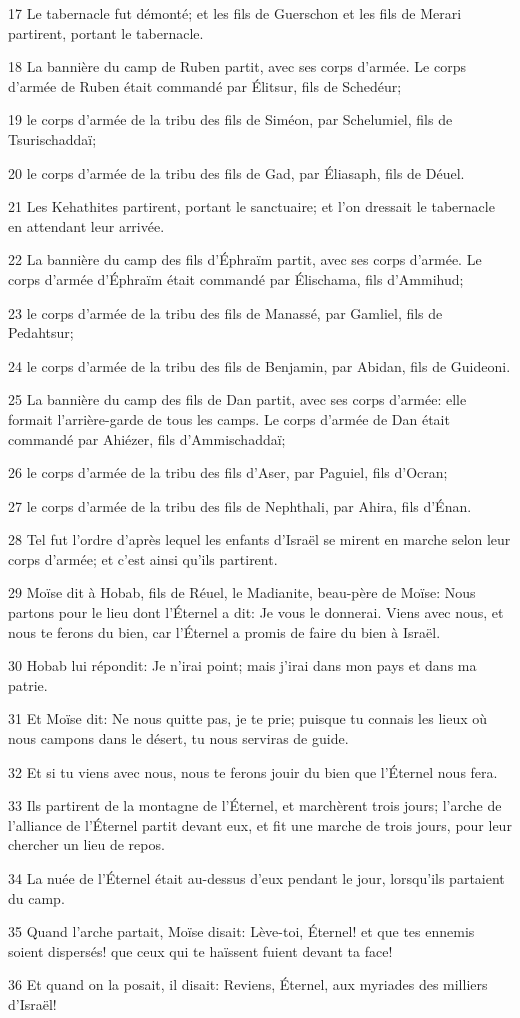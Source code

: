 \par 17 Le tabernacle fut démonté; et les fils de Guerschon et les fils de Merari partirent, portant le tabernacle.
\par 18 La bannière du camp de Ruben partit, avec ses corps d'armée. Le corps d'armée de Ruben était commandé par Élitsur, fils de Schedéur;
\par 19 le corps d'armée de la tribu des fils de Siméon, par Schelumiel, fils de Tsurischaddaï;
\par 20 le corps d'armée de la tribu des fils de Gad, par Éliasaph, fils de Déuel.
\par 21 Les Kehathites partirent, portant le sanctuaire; et l'on dressait le tabernacle en attendant leur arrivée.
\par 22 La bannière du camp des fils d'Éphraïm partit, avec ses corps d'armée. Le corps d'armée d'Éphraïm était commandé par Élischama, fils d'Ammihud;
\par 23 le corps d'armée de la tribu des fils de Manassé, par Gamliel, fils de Pedahtsur;
\par 24 le corps d'armée de la tribu des fils de Benjamin, par Abidan, fils de Guideoni.
\par 25 La bannière du camp des fils de Dan partit, avec ses corps d'armée: elle formait l'arrière-garde de tous les camps. Le corps d'armée de Dan était commandé par Ahiézer, fils d'Ammischaddaï;
\par 26 le corps d'armée de la tribu des fils d'Aser, par Paguiel, fils d'Ocran;
\par 27 le corps d'armée de la tribu des fils de Nephthali, par Ahira, fils d'Énan.
\par 28 Tel fut l'ordre d'après lequel les enfants d'Israël se mirent en marche selon leur corps d'armée; et c'est ainsi qu'ils partirent.
\par 29 Moïse dit à Hobab, fils de Réuel, le Madianite, beau-père de Moïse: Nous partons pour le lieu dont l'Éternel a dit: Je vous le donnerai. Viens avec nous, et nous te ferons du bien, car l'Éternel a promis de faire du bien à Israël.
\par 30 Hobab lui répondit: Je n'irai point; mais j'irai dans mon pays et dans ma patrie.
\par 31 Et Moïse dit: Ne nous quitte pas, je te prie; puisque tu connais les lieux où nous campons dans le désert, tu nous serviras de guide.
\par 32 Et si tu viens avec nous, nous te ferons jouir du bien que l'Éternel nous fera.
\par 33 Ils partirent de la montagne de l'Éternel, et marchèrent trois jours; l'arche de l'alliance de l'Éternel partit devant eux, et fit une marche de trois jours, pour leur chercher un lieu de repos.
\par 34 La nuée de l'Éternel était au-dessus d'eux pendant le jour, lorsqu'ils partaient du camp.
\par 35 Quand l'arche partait, Moïse disait: Lève-toi, Éternel! et que tes ennemis soient dispersés! que ceux qui te haïssent fuient devant ta face!
\par 36 Et quand on la posait, il disait: Reviens, Éternel, aux myriades des milliers d'Israël!

